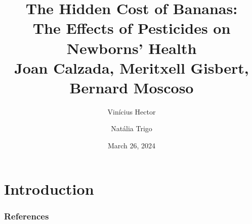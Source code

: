 \documentclass[hyperref={pdfpagelabels=false}]{beamer}
\title[The Hidden Cost of Bananas] { The Hidden Cost of Bananas:  \\ The Effects of Pesticides on Newborns’ Health  \\  \vspace{5mm} \large Joan Calzada, Meritxell Gisbert, Bernard Moscoso }
\author[Vinícius Hector and Natália Trigo]{Vinícius Hector \and Natália Trigo}
\date{March 26, 2024}
\institute[]{ \textcolor{blue}{JAERE (2023) }\\ \vspace{2mm} Environmental and Urban Economics \\ Professor: Sophie Mattes}
\begin{document}
	
	\begin{frame}
		\titlepage
	\end{frame} 
	
	
	\begin{frame}
		\frametitle{}
		\tableofcontents
	\end{frame} 
	
	
	\section{Introduction} 
	\begin{frame}

\end{frame}
	

	\begin{frame}
		\frametitle{References}
		
	\end{frame}
	
	
\end{document}
